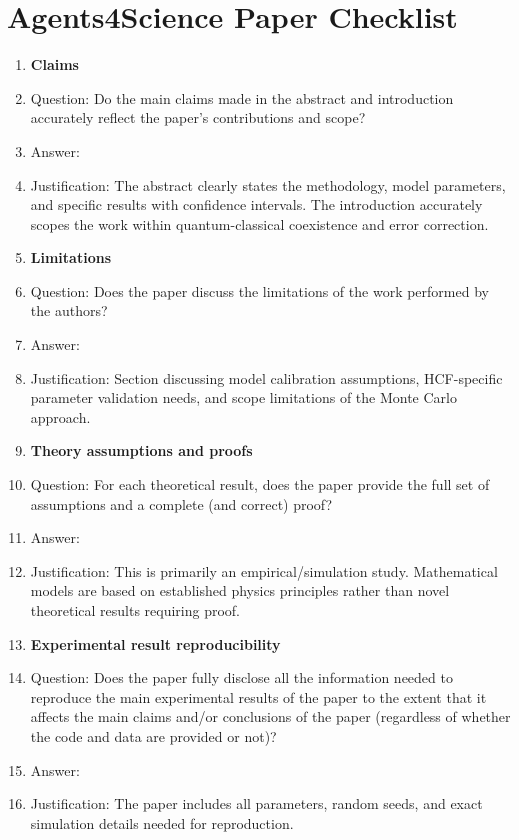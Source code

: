 \documentclass{article}
\begin{document}
\newpage

\section*{Agents4Science Paper Checklist}

\begin{enumerate}

\item {\bf Claims}
    \item[] Question: Do the main claims made in the abstract and introduction accurately reflect the paper's contributions and scope?
    \item[] Answer: \answerYes{}
    \item[] Justification: The abstract clearly states the methodology, model parameters, and specific results with confidence intervals. The introduction accurately scopes the work within quantum-classical coexistence and error correction.

\item {\bf Limitations}
    \item[] Question: Does the paper discuss the limitations of the work performed by the authors?
    \item[] Answer: \answerYes{}
    \item[] Justification: Section discussing model calibration assumptions, HCF-specific parameter validation needs, and scope limitations of the Monte Carlo approach.

\item {\bf Theory assumptions and proofs}
    \item[] Question: For each theoretical result, does the paper provide the full set of assumptions and a complete (and correct) proof?
    \item[] Answer: \answerNA{}
    \item[] Justification: This is primarily an empirical/simulation study. Mathematical models are based on established physics principles rather than novel theoretical results requiring proof.

\item {\bf Experimental result reproducibility}
    \item[] Question: Does the paper fully disclose all the information needed to reproduce the main experimental results of the paper to the extent that it affects the main claims and/or conclusions of the paper (regardless of whether the code and data are provided or not)?
    \item[] Answer: \answerYes{}
    \item[] Justification: The paper includes all parameters, random seeds, and exact simulation details needed for reproduction.


\end{enumerate}
\end{document}
